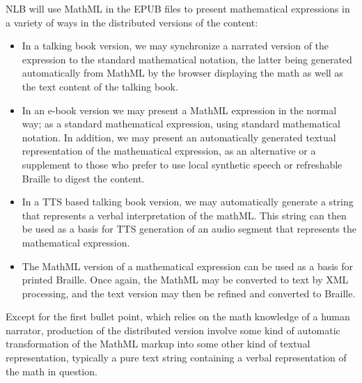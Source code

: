 \documentclass[english,a4paper,11pt]{article}
\begin{document}
NLB will use MathML in the EPUB files to present mathematical expressions in a variety of ways in the distributed versions of the content:
\begin{itemize}
	\item In a talking book version, we may synchronize a narrated version of the expression to the standard mathematical notation, the latter being generated automatically from MathML by the browser displaying the math as well as the text content of the talking book.

	\item In an e-book version we may present a MathML expression in the normal way; as a standard mathematical expression, using standard mathematical notation. In addition, we may present an automatically generated  textual representation of the mathematical expression, as an alternative or a supplement to those who prefer to use local synthetic speech or refreshable Braille to digest the content.
	
	
	\item In a TTS based talking book version, we may automatically generate a string that represents a verbal interpretation of the mathML. This string can then be used as a basis for TTS generation of an audio segment that represents the mathematical expression.
	
	\item The MathML version of a mathematical expression can be used as a basis for printed Braille. Once again, the MathML may be converted to text by XML processing, and the text version may then be refined and converted to Braille.
\end{itemize}
Except for the first bullet point, which relies on the math knowledge of a  human narrator, production of the distributed version involve some kind of automatic transformation of the MathML markup into some other kind of textual representation, typically a pure text string containing a verbal representation of the math in question. 
\end{document}
